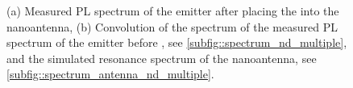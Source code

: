 			\begin{figure}[htp]
				\begin{subfigure}[t]{ 0.49\linewidth}
					\centering
					\caption{}
					\label{subfig::spectrum_antenna_nd_multiple}
				\end{subfigure}
				\hfill
				\begin{subfigure}[t]{ 0.49\linewidth}
					\centering
					\caption{}
					\label{subfig::antenna_convolution}
				\end{subfigure}
				\caption[Spectra of a \nd coupled to an antenna]{(a) Measured PL spectrum of the emitter after placing the \nd into the nanoantenna, (b) Convolution of the spectrum of the measured PL spectrum of the emitter before \pp, see \autoref{subfig::spectrum_nd_multiple}, and the simulated resonance spectrum of the nanoantenna, see \autoref{subfig::spectrum_antenna_nd_multiple}.}
			\end{figure}

